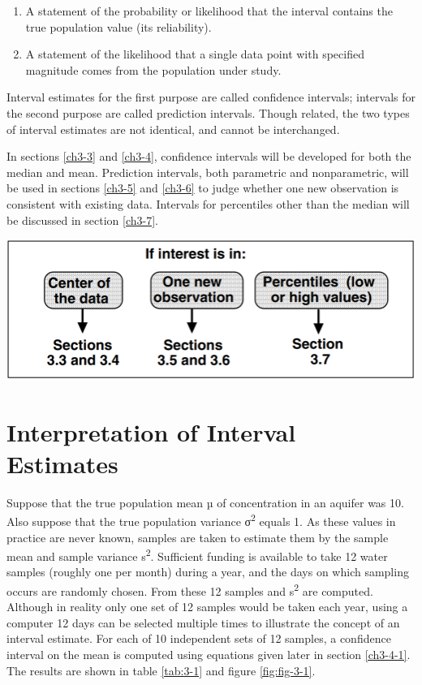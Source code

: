 \documentclass[]{book}
\providecommand{\tightlist}{%
  \setlength{\itemsep}{0pt}\setlength{\parskip}{0pt}}
\begin{document}
\begin{enumerate}
\def\labelenumi{\arabic{enumi}.}
\tightlist
\item
  A statement of the probability or likelihood that the interval contains the true population value (its reliability).
\item
  A statement of the likelihood that a single data point with specified magnitude comes from the population under study.
\end{enumerate}

Interval estimates for the first purpose are called confidence intervals; intervals for the second purpose are called prediction intervals. Though related, the two types of interval estimates are not identical, and cannot be interchanged.

In sections \ref{ch3-3} and \ref{ch3-4}, confidence intervals will be developed for both the median and mean. Prediction intervals, both parametric and nonparametric, will be used in sections \ref{ch3-5} and \ref{ch3-6} to judge whether one new observation is consistent with existing data. Intervals for percentiles other than the median will be discussed in section \ref{ch3-7}.

\begin{center}\includegraphics[width=14.03in]{figures/3_A} \end{center}

\hypertarget{interpretation-of-interval-estimates}{%
\section{Interpretation of Interval Estimates}\label{interpretation-of-interval-estimates}}

Suppose that the true population mean µ of concentration in an aquifer was 10. Also suppose that the true population variance σ\textsuperscript{2} equals 1. As these values in practice are never known, samples are taken to estimate them by the sample mean  and sample variance s\textsuperscript{2}. Sufficient funding is available to take 12 water samples (roughly one per month) during a year, and the days on which sampling occurs are randomly chosen. From these 12 samples  and s\textsuperscript{2} are computed. Although in reality only one set of 12 samples would be taken each year, using a computer 12 days can be selected multiple times to illustrate the concept of an interval estimate. For each of 10 independent sets of 12 samples, a confidence interval on the mean is computed using equations given later in section \ref{ch3-4-1}. The results are shown in table \ref{tab:3-1} and figure \ref{fig:fig-3-1}.
\end{document}
